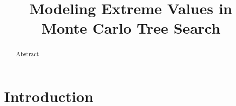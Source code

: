 \documentclass[runningheads,a4paper]{llncs}
\begin{document}
\mainmatter  %

\title{Modeling Extreme Values in Monte Carlo Tree Search}

\titlerunning{ }

%
%
\author{ }
%
\authorrunning{ }

% 



%
%


\maketitle


\begin{abstract}
Abstract
\end{abstract}

\section{Introduction}
\end{document}
